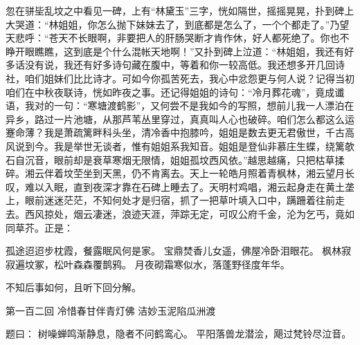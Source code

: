 \documentclass[12pt,oneside]{book}
\begin{document}
忽在骈坒乱坟之中看见一碑，上有“林黛玉”三字，恍如隔世，摇摇晃晃，扑到碑上大哭道：“林姐姐，你怎么抛下妹妹去了，到底都是怎么了，一个个都走了。”乃望天悲呼：“苍天不长眼啊，非要把人的肝肠哭断才肯作休，好人都死绝了。你也不睁开眼瞧瞧，这到底是个什么混帐天地啊！”又扑到碑上泣道：“林姐姐，我还有好多话没有说，我还有好多诗句藏在腹中，等着和你一较高低。我还想多开几回诗社，咱们姐妹们比比诗才。可如今你孤苦死去，我心中忿怨更与何人说？记得当初咱们在中秋夜联诗，恍如昨夜之事。还记得姐姐的诗句：“冷月葬花魂”，竟成谶语，我对的一句：“寒塘渡鹤影”，又何尝不是我如今的写照，想前儿我一人漂泊在异乡，路过一片池塘，从那芦苇丛里穿过，真真叫人心也破碎。咱们怎么都这么运蹇命薄？我是萧疏篱畔科头坐，清冷香中抱膝吟，姐姐是数去更无君傲世，千古高风说到今。我是举世无谈者，惟有姐姐系我知音。姐姐是登仙非慕庄生蝶，绕篱欹石自沉音，眼前却是衰草寒烟无限情，姐姐孤坟西风依。”越思越痛，只把枯草揉碎。湘云伴着坟茔坐到天黑，仍不肯离去。天上一轮皓月照着青枫林，湘云望月长叹，难以入眠，直到夜深才靠在石碑上睡去了。天明村鸡唱，湘云起身走在黄土垄上，眼前迷迷茫茫，不知何处才是归宿，抓了一把草叶填入口中，蹒跚着往前走去。西风掠处，烟云凄迷，浪迹天涯，萍踪无定，可叹公府千金，沦为乞丐，竟如同草芥。正是：

孤途迢迢步枕霞，餐露眠风何是家。
宝鼎焚香儿女遥，佛屋冷卧泪眼花。
枫林寂寂遍坟冢，松叶森森覆鹊鸦。
月夜砌霜寒似水，落蓬野径度年华。

不知后事如何，且听下回分解。

 
第一百二回 冷惜春甘伴青灯佛 洁妙玉泥陷瓜洲渡

题曰：
树噪蝉鸣渐静息，隐者不问鹤鸾心。
平阳落兽龙潜浍，飓过梵铃尽泣音。
\end{document}
